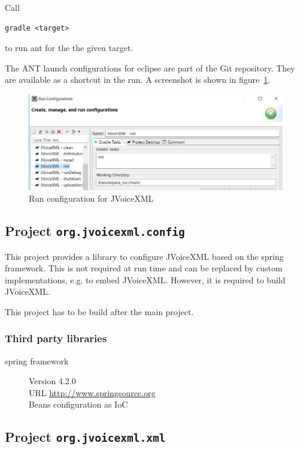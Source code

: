 \documentclass[11pt,a4paper]{article}
\begin{document}
Call
\begin{lstlisting}
gradle <target>
\end{lstlisting}
to run ant for the the given target.

The ANT launch configurations for eclipse are part of the Git repository. They
are available as a shortcut in the run. A screenshot is shown in figure~\ref{fig:eclipse-launch}.
\begin{figure}
\includegraphics[width=\linewidth]{eclipse-launch.png}
\caption{Run configuration for JVoiceXML}
\label{fig:eclipse-launch}
\end{figure}

\subsection{Project \texttt{org.jvoicexml.config}}
\label{sec:org.jvoicexml.config}

This project provides a library to configure JVoiceXML based on the spring
framework.
This is not required at run time and can be replaced by custom
implementations, e.g. to embed JVoiceXML. However, it is required to build
JVoiceXML.

This project has to be build after the main project.

\subsubsection{Third party libraries}
\label{sec:config-third-party-libr}

\begin{description}
\item[spring framework] Version 4.2.0 \\
URL \url{http://www.springsource.org} \\
Beans configuration as IoC 
\end{description}

\subsection{Project \texttt{org.jvoicexml.xml}}
\label{sec:org.jvoicexml.xml}
\end{document}
